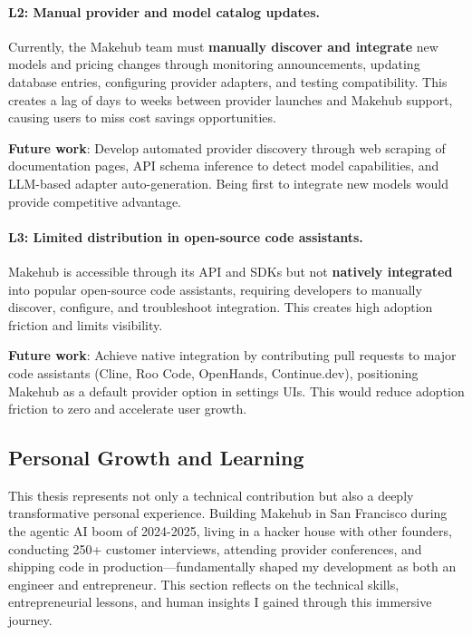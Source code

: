 \documentclass[english]{article}
\begin{document}
\paragraph{L2: Manual provider and model catalog updates.}

Currently, the Makehub team must \textbf{manually discover and integrate} new models and pricing changes through monitoring announcements, updating database entries, configuring provider adapters, and testing compatibility. This creates a lag of days to weeks between provider launches and Makehub support, causing users to miss cost savings opportunities.

\textbf{Future work}: Develop automated provider discovery through web scraping of documentation pages, API schema inference to detect model capabilities, and LLM-based adapter auto-generation. Being first to integrate new models would provide competitive advantage.

\paragraph{L3: Limited distribution in open-source code assistants.}

Makehub is accessible through its API and SDKs but not \textbf{natively integrated} into popular open-source code assistants, requiring developers to manually discover, configure, and troubleshoot integration. This creates high adoption friction and limits visibility.

\textbf{Future work}: Achieve native integration by contributing pull requests to major code assistants (Cline, Roo Code, OpenHands, Continue.dev), positioning Makehub as a default provider option in settings UIs. This would reduce adoption friction to zero and accelerate user growth.

\subsection{Personal Growth and Learning}

This thesis represents not only a technical contribution but also a deeply transformative personal experience. Building Makehub in San Francisco during the agentic AI boom of 2024-2025, living in a hacker house with other founders, conducting 250+ customer interviews, attending provider conferences, and shipping code in production—fundamentally shaped my development as both an engineer and entrepreneur. This section reflects on the technical skills, entrepreneurial lessons, and human insights I gained through this immersive journey.
\end{document}

